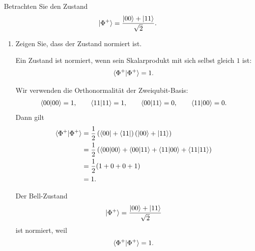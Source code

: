\documentclass[11pt,a4paper]{scrartcl}
\begin{document}
    Betrachten Sie den Zustand
    \begin{align*}
        \ket{\Phi^+}
        =
        \frac{\ket{00}+\ket{11}}{\sqrt2}.
    \end{align*}

    \begin{enumerate}[label=(\alph*)]
        \item Zeigen Sie, dass der Zustand normiert ist.

        \begin{calculationbox}
            Ein Zustand ist normiert, wenn sein Skalarprodukt mit sich selbst gleich $1$ ist:
            \begin{align*}
                \braket{\Phi^+|\Phi^+}=1.
            \end{align*}

            \begin{calculationbox}[title=Normierung]
                Wir verwenden die Orthonormalität der Zweiqubit-Basis:
                \begin{align*}
                    \braket{00|00}=1,
                    \qquad
                    \braket{11|11}=1,
                    \qquad
                    \braket{00|11}=0,
                    \qquad
                    \braket{11|00}=0.
                \end{align*}
                Dann gilt
                \begin{align*}
                    \braket{\Phi^+|\Phi^+}
                    &=
                    \frac{1}{2}
                    \left(
                        \bra{00}+\bra{11}
                    \right)
                    \left(
                        \ket{00}+\ket{11}
                    \right)\\
                    &=
                    \frac{1}{2}
                    \left(
                        \braket{00|00}
                        +
                        \braket{00|11}
                        +
                        \braket{11|00}
                        +
                        \braket{11|11}
                    \right)\\
                    &=
                    \frac{1}{2}(1+0+0+1)\\
                    &=
                    1.
                \end{align*}
            \end{calculationbox}

            \begin{solutionbox}[title=Normierung]
                Der Bell-Zustand
                \begin{align*}
                    \ket{\Phi^+}
                    =
                    \frac{\ket{00}+\ket{11}}{\sqrt2}
                \end{align*}
                ist normiert, weil
                \begin{align*}
                    \braket{\Phi^+|\Phi^+}=1.
                \end{align*}
            \end{solutionbox}
        \end{calculationbox}


\end{enumerate}
\end{document}
